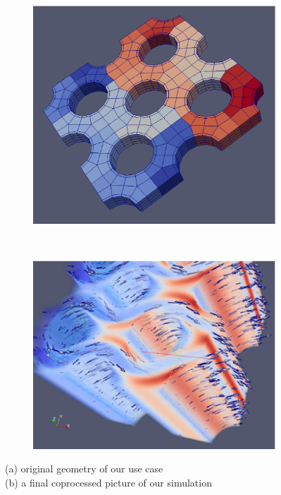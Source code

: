 \begin{figure}
  \centering
  \begin{subfigure}[b]{0.45\textwidth}
    \includegraphics[scale=0.195]{pictures/pieceofcake.eps}
    \label{fig:piece}
  \end{subfigure}
  ~
  \begin{subfigure}[b]{0.45\textwidth}
    \includegraphics[scale=0.41]{pictures/res.eps}
    \label{fig:res}
  \end{subfigure}
  \caption{(a) original geometry of our use case\\
  \hspace{8em}(b)  a final coprocessed picture of our simulation}
  \vspace{-3em}
\end{figure}

